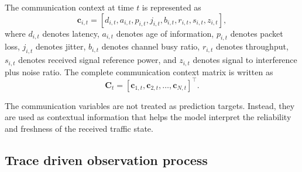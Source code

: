 \documentclass[pdflatex,sn-mathphys-num]{sn-jnl}%
\theoremstyle{thmstyleone}%
\theoremstyle{thmstyletwo}%
\theoremstyle{thmstylethree}%
\begin{document}
The communication context at time \(t\) is represented as
\begin{equation}
    \mathbf{c}_{i,t}
    =
    \left[
    d_{i,t},
    a_{i,t},
    p_{i,t},
    j_{i,t},
    b_{i,t},
    r_{i,t},
    s_{i,t},
    z_{i,t}
    \right],
\end{equation}
where \(d_{i,t}\) denotes latency, \(a_{i,t}\) denotes age of information, \(p_{i,t}\) denotes packet loss, \(j_{i,t}\) denotes jitter, \(b_{i,t}\) denotes channel busy ratio, \(r_{i,t}\) denotes throughput, \(s_{i,t}\) denotes received signal reference power, and \(z_{i,t}\) denotes signal to interference plus noise ratio. The complete communication context matrix is written as
\begin{equation}
    \mathbf{C}_{t}
    =
    \left[
    \mathbf{c}_{1,t},
    \mathbf{c}_{2,t},
    \ldots,
    \mathbf{c}_{N,t}
    \right]^{\top}.
\end{equation}

The communication variables are not treated as prediction targets. Instead, they are used as contextual information that helps the model interpret the reliability and freshness of the received traffic state.

\subsection{Trace driven observation process}
\end{document}
